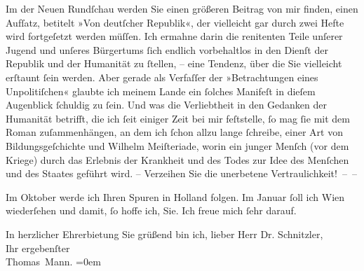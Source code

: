 \pstart
           Im \label{K_L02392-1v}\label{K_L02392-1} der Neuen Rundſchau werden Sie einen größeren Beitrag
               von mir finden, einen Aufſatz, betitelt »Von
                  deutſcher Republik«, der vielleicht gar durch zwei Hefte wird fortgeſetzt
               werden müſſen. Ich ermahne darin die renitenten Teile unſerer Jugend und unſeres
               Bürgertums ſich endlich vorbehaltlos in den Dienſt der Republik und der Humanität zu
               ſtellen, – eine Tendenz, über die Sie vielleicht erſtaunt ſein werden. Aber gerade
               als Verfaſſer der »Betrachtungen eines
                  Unpolitiſchen« glaubte ich meinem Lande ein ſolches Manifeſt in dieſem
               Augenblick ſchuldig zu ſein. Und was die Verliebtheit in den Gedanken der Humanität
               betrifft, die ich ſeit einiger Zeit bei mir feſtstelle, ſo mag ſie mit dem Roman zuſammenhängen, an dem
               ich ſchon {\pb}allzu lange ſchreibe, einer Art
               von Bildungsgeſchichte und Wilhelm
                  Meiſteriade, worin ein junger Menſch (vor dem Kriege) durch das Erlebnis der
               Krankheit und des Todes zur Idee des Menſchen und des Staates geführt wird. –
               Verzeihen Sie die unerbetene Vertraulichkeit! – –\pend
           
\pstart
           Im Oktober werde ich Ihren Spuren in Holland folgen. Im Januar{ }ſoll ich Wien
               wiederſehen und damit, ſo hoffe ich, Sie. Ich freue mich ſehr darauf.\pend
           
\pstart
           In herzlicher Ehrerbietung Sie grüßend bin ich, lieber Herr Dr.
               Schnitzler,{\\[\baselineskip]}Ihr ergebenſter{\\[\baselineskip]}\spacefill\mbox{Thomas Mann.}\pend
           \leftskip=0em{}\endnumbering{}  
      